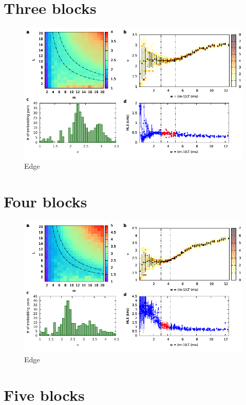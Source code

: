 \section{Three blocks}

\begin{figure}[H]
    \centering
    \includegraphics[width=\linewidth]{../3_blocks/edge/2e5_points/plots/chaos_low.pdf}
    \caption{Edge}
    \label{fig:3 blocks chaos}
\end{figure}

\section{Four blocks}

\begin{figure}[H]
    \centering
    \includegraphics[width=\linewidth]{../4_blocks/2e5_points_new/plots/chaos_low.pdf}
    \caption{Edge}
    \label{fig:4 blocks chaos}
\end{figure}


\section{Five blocks}

